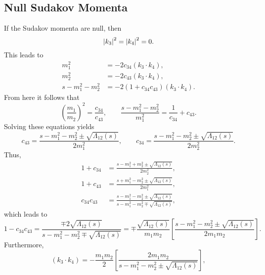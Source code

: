 \subsection{Null Sudakov Momenta}
If the Sudakov momenta are null, then
\begin{equation}
	\left\lvert k_{3} \right\rvert^{2} = \left\lvert k_{4} \right\rvert^{2} = 0.
\end{equation}
This leads to
\begin{equation}
\begin{split}
	m_{1}^{2} &= -2 c_{34} \left(k_{3} \cdot k_{4} \right), \\
	m_{2}^{2} &= -2 c_{43} \left(k_{3} \cdot k_{4} \right), \\
	s - m_{1}^{2} - m_{2}^{2} &= -2\left(1 + c_{34}c_{43} \right) \left(k_{3} \cdot k_{4} \right).
\end{split}
\end{equation}
From here it follows that
\begin{equation}
	\left( \frac{m_{1}}{m_{2}} \right)^{2} = \frac{c_{34}}{c_{43}}, \qquad \frac{s - m_{1}^{2} - m_{2}^{2}}{m_{1}^{2}} = \frac{1}{c_{34}} + c_{43}.
\end{equation}
Solving these equations yields
\begin{equation}
	c_{43} = \frac{s - m_{1}^{2} - m_{2}^{2} \pm \sqrt{\Lambda_{12}(s)}}{2 m_{1}^{2}}, \qquad c_{34} = \frac{s - m_{1}^{2} - m_{2}^{2} \pm \sqrt{\Lambda_{12}(s)}}{2 m_{2}^{2}}.
\end{equation}
Thus,
\begin{align}
	1 + c_{34} &= \frac{s - m_{1}^{2} + m_{2}^{2} \pm \sqrt{\Lambda_{12}(s)}}{2 m_{2}^{2}}, \\
	1 + c_{43} &= \frac{s + m_{1}^{2} - m_{2}^{2} \pm \sqrt{\Lambda_{12}(s)}}{2 m_{1}^{2}}, \\
	c_{34} c_{43} &= \frac{s - m_{1}^{2} - m_{2}^{2} \pm \sqrt{\Lambda_{12}(s)}}{s - m_{1}^{2} - m_{2}^{2} \mp \sqrt{\Lambda_{12}(s)}},
\end{align}
which leads to
\begin{equation}
	1 - c_{34} c_{43} = \frac{\mp 2 \sqrt{\Lambda_{12}(s)}}{s - m_{1}^{2} - m_{2}^{2} \mp \sqrt{\Lambda_{12}(s)}} = \mp \frac{\sqrt{\Lambda_{12}(s)}}{m_{1} m_{2}} \left[ \frac{s - m_{1}^{2} - m_{2}^{2} \pm \sqrt{\Lambda_{12}(s)}}{2 m_{1} m_{2}} \right] .
\end{equation}
Furthermore,
\begin{equation}
	\left( k_{3} \cdot k_{4} \right) = - \frac{m_{1} m_{2}}{2} \left[ \frac{2m_{1} m_{2}}{s - m_{1}^{2} - m_{2}^{2} \pm \sqrt{\Lambda_{12}(s)}} \right],
\end{equation}
